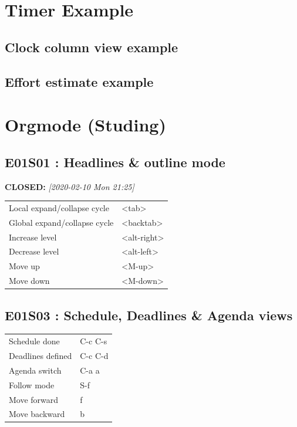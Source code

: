 \documentclass[11pt]{article}
\begin{document}
\section{Timer Example}
\label{sec:org5976fcc}

\subsection{Clock column view example}
\label{sec:org3746bad}

\subsection{Effort estimate example}
\label{sec:orgc7a85f4}

\section{Orgmode (Studing)}
\label{sec:org4e5cc53}
\subsection{E01S01 : Headlines \& outline mode}
\label{sec:org7578e8c}
\noindent\textbf{CLOSED:} \textit{[2020-02-10 Mon 21:25]}\\
\begin{center}
\begin{tabular}{ll}
Local expand/collapse cycle &  <tab> \\
Global expand/collapse cycle &  <backtab> \\
Increase level &  <alt-right> \\
Decrease level &  <alt-left> \\
Move up &  <M-up> \\
Move down &  <M-down> \\
\end{tabular}
\end{center}

\subsection{E01S03 : Schedule, Deadlines \& Agenda views}
\label{sec:org005f1a8}
\begin{center}
\begin{tabular}{ll}
Schedule done &  C-c C-s \\
Deadlines defined &  C-c C-d \\
Agenda switch &  C-a a \\
Follow mode &  S-f \\
Move forward &  f \\
Move backward &  b \\
\end{tabular}
\end{center}
\end{document}
